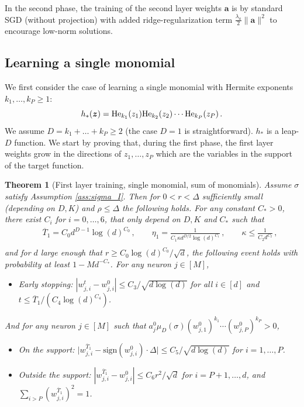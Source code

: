 \documentclass[11pt]{article}
\newcommand{\<}{\langle}
\renewcommand{\>}{\rangle}
\newcommand{\sign}{\text{sign}}
\newtheorem{theorem}{Theorem}
\theoremstyle{definition}
\def\ba{{\boldsymbol a}}
\def\bz{{\boldsymbol z}}
\def\bz{{\boldsymbol z}}
\def\He{{\rm He}}
\def\ba{{\boldsymbol a}}
\def\bz{{\boldsymbol z}}
\def\He{{\rm He}}
\def\oT{\overline{T}}
\begin{document}
In the second phase, the training of the second layer weights $\ba$ is by standard SGD (without projection) with added ridge-regularization term $\frac{\lambda_a}{2} \|\ba\|^2$ to encourage low-norm solutions.

\subsection{Learning a single monomial}

We first consider the case of learning a single monomial with Hermite exponents $k_1, \ldots, k_P \geq 1$:
\[
h_* (\bz) = \He_{k_1} (z_1) \He_{k_2} (z_2) \cdots \He_{k_P} (z_P)\, .
\]
We assume $D = k_1 + \ldots + k_P \geq 2$ (the case $D=1$ is straightforward). $h_*$ is a leap-$D$ function. We start by proving that, during the first phase, the first layer weights grow in the directions of $z_1,\ldots,z_P$ which are the variables in the support of the target function.


\begin{theorem}[First layer training, single monomial, sum of monomials]\label{thm:alignment_one_monomial}
Assume $\sigma$ satisfy Assumption \ref{ass:sigma_I}. 
Then for $0 < r < \Delta$ sufficiently small (depending on $D,K$) and $\rho \leq \Delta$ the following holds. For any constant $C_*>0$, there exist $C_i$ for $i= 0, \ldots , 6$, that only depend on $D,K$ and $C_*$ such that
\[
\begin{aligned}
\qquad \oT_1 = C_0 d^{D-1} \log(d)^{C_0}\, , \qquad \eta_1 = \frac{1}{C_1 \kappa d^{D/2} \log(d)^{C_1} }\, , \qquad \kappa \leq \frac{1}{C_2 d^{C_2}}\,, \\
\end{aligned}
\]
and for $d$ large enough that $r \geq C_0 \log(d)^{C_0} / \sqrt{d}$, the following event holds with probability at least $1 - Md^{-C_*}$. For any neuron $j \in [M]$,
\begin{itemize}
    \item[(a)] Early stopping: $| w_{j,i}^{t} - w_{j,i}^0| \leq C_3 /\sqrt{d \log (d)}$ for all $i \in [d]$ and $t \leq \oT_1/ (C_4 \log (d)^{C_4})$.
\end{itemize}

And for any neuron $j \in [M]$ such that $a_j^0 \mu_D (\sigma) (w_{j,1}^0)^{k_1} \cdots (w_{j,P}^0)^{k_P} > 0$, 
\begin{itemize}
    \item[(b)] On the support: $\big\vert  w_{j,i}^{\oT_1}  - \sign (w_{j,i}^0) \cdot \Delta \big\vert \leq C_5 /\sqrt{d \log (d)}$ for $i = 1, \ldots , P$.

    \item[(c)] Outside the support: $| w_{j,i}^{\oT_1} - w_{j,i}^0| \leq C_6 r^2 /\sqrt{d}$ for $i = P+1, \ldots , d$, and $\sum_{ i >P} (w_{j,i}^{\oT_1})^2 = 1$.
\end{itemize}
\end{theorem}
\end{document}
